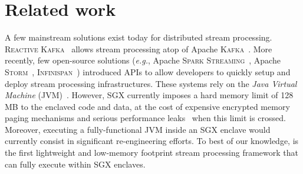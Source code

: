 \section{Related work}\label{sec:rw}

A few mainstream solutions exist today for distributed stream processing.
\textsc{Reactive Kafka}~\cite{reactivekafka} allows stream processing atop of Apache \textsc{Kafka}~\cite{apachekafka}.
More recently, few open-source solutions (\emph{e.g.}, Apache \textsc{Spark Streaming}~\cite{apachesparkstreaming}, Apache \textsc{Storm}~\cite{apachestorm}, \textsc{Infinispan}~\cite{infinispan}) introduced APIs to allow developers to quickly setup and deploy stream processing infrastructures.
These systems rely on the \emph{Java Virtual Machine} (JVM)~\cite{lindholm2014java}.
However, SGX currently imposes a hard memory limit of 128\,MB to the enclaved code and data, at the cost of expensive encrypted memory paging mechanisms and serious performance leaks~\cite{pires_scbr:2016,brenner_securekeeper:_2016} when this limit is crossed.
Moreover, executing a fully-functional JVM inside an SGX enclave would currently consist in significant re-engineering efforts.
To best of our knowledge, \SYS{} is the first lightweight and low-memory footprint stream processing framework that can fully execute within SGX enclaves.